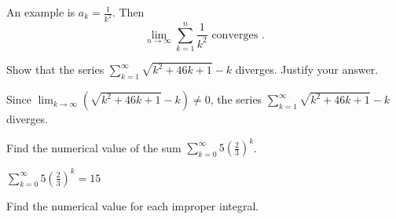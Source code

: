 \documentclass[12pt,fleqn,answers]{exam}
\begin{document}
\begin{questions}
    \begin{solution}%
    An example is $a_k = \frac{1}{k^2}$. Then 
        \begin{equation*}
            \lim_{n \to \infty} \sum_{k=1}^n \frac{1}{k^2}  \text{ converges }.
      \end{equation*}
    \end{solution}
    
    \newpage 
    \question   Show that the series $\displaystyle \sum_{k=1}^\infty \sqrt{k^2 + 46 k+ 1} - k$
    diverges. Justify your answer.
    \begin{solution}[2.50in]
        Since $\displaystyle \lim_{k \to \infty} \left(\sqrt{k^2 + 46 k+ 1} - k \right) \neq 0$, 
        the  series $\displaystyle \sum_{k=1}^\infty \sqrt{k^2 + 46 k+ 1} - k$ diverges.
    \end{solution}
    
    \question   Find the numerical value of the sum 
    $\sum_{k=0}^\infty 5 \left(\frac{2}{3} \right)^k$.
    
    \begin{solution}%
        $\sum_{k=0}^\infty 5 \left(\frac{2}{3} \right)^k = 15$
    \end{solution}
    
    \newpage 
    
    \question Find the numerical value for each improper integral.
    
    

\end{questions}
\end{document}
